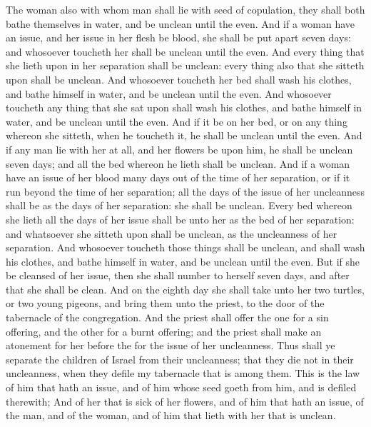 \begin{biblechapter}
\verse The woman also with whom man shall lie with seed of copulation, they shall both bathe themselves in water, and be unclean until the even.
\verse And if a woman have an issue, and her issue in her flesh be blood, she shall be put apart seven days: and whosoever toucheth her shall be unclean until the even.
\verse And every thing that she lieth upon in her separation shall be unclean: every thing also that she sitteth upon shall be unclean.
\verse And whosoever toucheth her bed shall wash his clothes, and bathe himself in water, and be unclean until the even.
\verse And whosoever toucheth any thing that she sat upon shall wash his clothes, and bathe himself in water, and be unclean until the even.
\verse And if it be on her bed, or on any thing whereon she sitteth, when he toucheth it, he shall be unclean until the even.
\verse And if any man lie with her at all, and her flowers be upon him, he shall be unclean seven days; and all the bed whereon he lieth shall be unclean.
\verse And if a woman have an issue of her blood many days out of the time of her separation, or if it run beyond the time of her separation; all the days of the issue of her uncleanness shall be as the days of her separation: she shall be unclean.
\verse Every bed whereon she lieth all the days of her issue shall be unto her as the bed of her separation: and whatsoever she sitteth upon shall be unclean, as the uncleanness of her separation.
\verse And whosoever toucheth those things shall be unclean, and shall wash his clothes, and bathe himself in water, and be unclean until the even.
\verse But if she be cleansed of her issue, then she shall number to herself seven days, and after that she shall be clean.
\verse And on the eighth day she shall take unto her two turtles, or two young pigeons, and bring them unto the priest, to the door of the tabernacle of the congregation.
\verse And the priest shall offer the one for a sin offering, and the other for a burnt offering; and the priest shall make an atonement for her before the \LORD for the issue of her uncleanness.
\verse Thus shall ye separate the children of Israel from their uncleanness; that they die not in their uncleanness, when they defile my tabernacle that is among them.
\verse This is the law of him that hath an issue, and of him whose seed goeth from him, and is defiled therewith;
\verse And of her that is sick of her flowers, and of him that hath an issue, of the man, and of the woman, and of him that lieth with her that is unclean.
\end{biblechapter}

